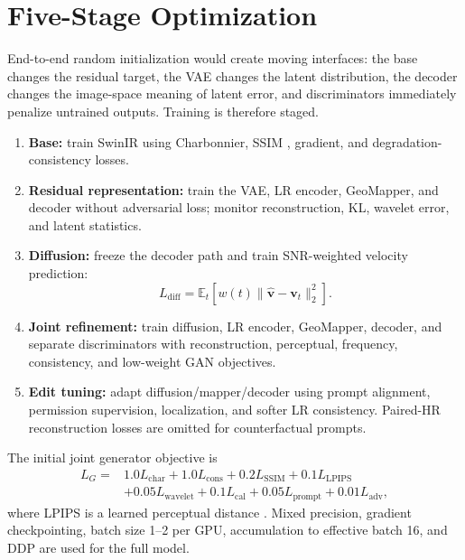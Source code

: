 \documentclass[10pt]{article}
\newcommand{\vect}[1]{\boldsymbol{#1}}
\begin{document}
\clearpage

\section{Five-Stage Optimization}
End-to-end random initialization would create moving interfaces: the base changes the residual
target, the VAE changes the latent distribution, the decoder changes the image-space meaning of
latent error, and discriminators immediately penalize untrained outputs. Training is therefore
staged.

\begin{enumerate}
  \item \textbf{Base:} train SwinIR using Charbonnier, SSIM \citep{wang2004ssim}, gradient, and
        degradation-consistency losses.
  \item \textbf{Residual representation:} train the VAE, LR encoder, GeoMapper, and decoder without
        adversarial loss; monitor reconstruction, KL, wavelet error, and latent statistics.
  \item \textbf{Diffusion:} freeze the decoder path and train SNR-weighted velocity prediction:
        \begin{equation}
          L_{\mathrm{diff}}=
          \mathbb{E}_{t}\!\left[
          w(t)\|\hat{\vect{v}}-\vect{v}_t\|_2^2\right].
        \end{equation}
  \item \textbf{Joint refinement:} train diffusion, LR encoder, GeoMapper, decoder, and separate
        discriminators with reconstruction, perceptual, frequency, consistency, and low-weight
        GAN objectives.
  \item \textbf{Edit tuning:} adapt diffusion/mapper/decoder using prompt alignment, permission
        supervision, localization, and softer LR consistency. Paired-HR reconstruction losses are
        omitted for counterfactual prompts.
\end{enumerate}

The initial joint generator objective is
\begin{equation}
\begin{split}
 L_G={}&1.0L_{\mathrm{char}}+1.0L_{\mathrm{cons}}
 +0.2L_{\mathrm{SSIM}}+0.1L_{\mathrm{LPIPS}}\\
 &+0.05L_{\mathrm{wavelet}}+0.1L_{\mathrm{cal}}
 +0.05L_{\mathrm{prompt}}
 +0.01L_{\mathrm{adv}},
\end{split}
\end{equation}
where LPIPS is a learned perceptual distance \citep{zhang2018unreasonable}. Mixed precision,
gradient checkpointing, batch size 1--2 per GPU, accumulation to effective batch 16, and DDP are
used for the full model.
\end{document}
